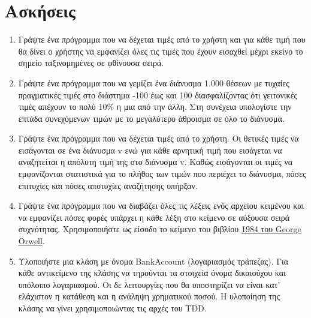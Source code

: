 



\section{Ασκήσεις}
\begin{enumerate}
\item Γράψτε ένα πρόγραμμα που να δέχεται τιμές από το χρήστη και για κάθε τιμή που θα δίνει ο χρήστης να εμφανίζει όλες τις τιμές που έχουν εισαχθεί μέχρι εκείνο το σημείο ταξινομημένες σε φθίνουσα σειρά. 
\item Γράψτε ένα πρόγραμμα που να γεμίζει ένα διάνυσμα 1.000 θέσεων με τυχαίες πραγματικές τιμές στο διάστημα -100 έως και 100 διασφαλίζοντας ότι γειτονικές τιμές απέχουν το πολύ 10\% η μια από την άλλη. Στη συνέχεια υπολογίστε την επτάδα συνεχόμενων τιμών με το μεγαλύτερο άθροισμα σε όλο το διάνυσμα.
\item Γράψτε ένα πρόγραμμα που να δέχεται τιμές από το χρήστη. Οι θετικές τιμές να εισάγονται σε ένα διάνυσμα v ενώ για κάθε αρνητική τιμή που εισάγεται να αναζητείται η απόλυτη τιμή της στο διάνυσμα v. Καθώς εισάγονται οι τιμές να εμφανίζονται στατιστικά για το πλήθος των τιμών που περιέχει το διάνυσμα, πόσες επιτυχίες και πόσες αποτυχίες αναζήτησης υπήρξαν.
\item Γράψτε ένα πρόγραμμα που να διαβάζει όλες τις λέξεις ενός αρχείου κειμένου και να εμφανίζει πόσες φορές υπάρχει η κάθε λέξη στο κείμενο σε αύξουσα σειρά συχνότητας. Χρησιμοποιήστε ως είσοδο το κείμενο του βιβλίου \href{http://gutenberg.net.au/ebooks01/0100021.txt}{1984 του George Orwell}.
\item Υλοποιήστε μια κλάση με όνομα BankAccount (λογαριασμός τράπεζας). Για κάθε αντικείμενο της κλάσης να τηρούνται τα στοιχεία όνομα δικαιούχου και υπόλοιπο λογαριασμού. Οι δε λειτουργίες που θα υποστηρίζει να είναι κατ' ελάχιστον η κατάθεση και η ανάληψη χρηματικού ποσού. Η υλοποίηση της κλάσης να γίνει χρησιμοποιώντας τις αρχές του TDD.
\end{enumerate}

